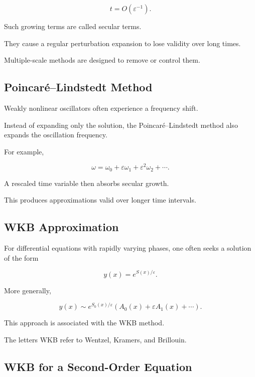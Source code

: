 \[
t=O(\varepsilon^{-1}).
\]

Such growing terms are called secular terms.

They cause a regular perturbation expansion to lose validity over long
times.

Multiple-scale methods are designed to remove or control them.

\subsection{Poincar\'e--Lindstedt Method}
\label{subsec:poincare-lindstedt}

Weakly nonlinear oscillators often experience a frequency shift.

Instead of expanding only the solution, the Poincar\'e--Lindstedt method
also expands the oscillation frequency.

For example,

\[
\boxed{
\omega
=
\omega_0
+
\varepsilon\omega_1
+
\varepsilon^2\omega_2
+\cdots.
}
\]

A rescaled time variable then absorbs secular growth.

This produces approximations valid over longer time intervals.

\subsection{WKB Approximation}
\label{subsec:wkb-approximation}

For differential equations with rapidly varying phases, one often seeks
a solution of the form

\[
\boxed{
y(x)
=
e^{S(x)/\varepsilon}.
}
\]

More generally,

\[
\boxed{
y(x)
\sim
e^{S_0(x)/\varepsilon}
\left(
A_0(x)
+
\varepsilon A_1(x)
+\cdots
\right).
}
\]

This approach is associated with the WKB method.

The letters WKB refer to Wentzel, Kramers, and Brillouin.

\subsection{WKB for a Second-Order Equation}
\label{subsec:wkb-second-order}

